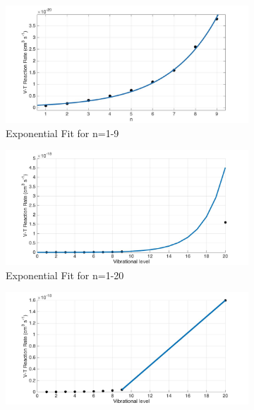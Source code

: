 \documentclass[11pt, oneside]{article}   	%
\begin{document}
\begin{figure}
\begin{subfigure}{0.5\textwidth}
\begin{center}
\includegraphics[width=\textwidth]{Figures/ExpFit}
\caption{Exponential Fit for n=1-9}
\label{subfig:Exp}
\end{center}
\end{subfigure}
\begin{subfigure}{0.5\textwidth}
\includegraphics[width=\textwidth]{Figures/ExpFitAll}
\caption{Exponential Fit for n=1-20}
\label{subfig:ExpAll}
\end{subfigure}
\begin{subfigure}{0.5\textwidth}
\includegraphics[width=\textwidth]{Figures/Linear}

\end{subfigure}
\end{figure}
\end{document}
